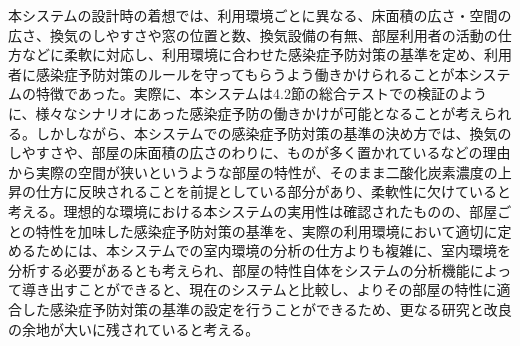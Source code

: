 本システムの設計時の着想では、利用環境ごとに異なる、床面積の広さ・空間の広さ、換気のしやすさや窓の位置と数、換気設備の有無、部屋利用者の活動の仕方などに柔軟に対応し、利用環境に合わせた感染症予防対策の基準を定め、利用者に感染症予防対策のルールを守ってもらうよう働きかけられることが本システムの特徴であった。実際に、本システムは4.2節の総合テストでの検証のように、様々なシナリオにあった感染症予防の働きかけが可能となることが考えられる。しかしながら、本システムでの感染症予防対策の基準の決め方では、換気のしやすさや、部屋の床面積の広さのわりに、ものが多く置かれているなどの理由から実際の空間が狭いというような部屋の特性が、そのまま二酸化炭素濃度の上昇の仕方に反映されることを前提としている部分があり、柔軟性に欠けていると考える。理想的な環境における本システムの実用性は確認されたものの、部屋ごとの特性を加味した感染症予防対策の基準を、実際の利用環境において適切に定めるためには、本システムでの室内環境の分析の仕方よりも複雑に、室内環境を分析する必要があるとも考えられ、部屋の特性自体をシステムの分析機能によって導き出すことができると、現在のシステムと比較し、よりその部屋の特性に適合した感染症予防対策の基準の設定を行うことができるため、更なる研究と改良の余地が大いに残されていると考える。


